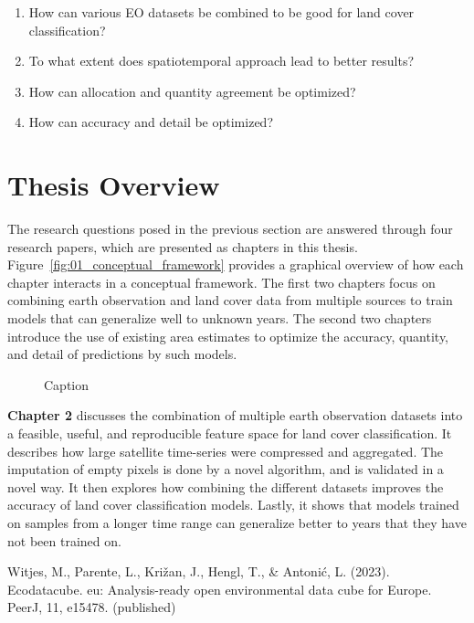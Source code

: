 \begin{enumerate}
    \item How can various EO datasets be combined to be good for land cover classification?
    \item To what extent does spatiotemporal approach lead to better results?
    \item How can allocation and quantity agreement be optimized?
    \item How can accuracy and detail be optimized?
\end{enumerate}



\section{Thesis Overview}

The research questions posed in the previous section are answered through four research papers, which are presented as chapters in this thesis. Figure~\ref{fig:01_conceptual_framework} provides a graphical overview of how each chapter interacts in a conceptual framework. The first two chapters focus on combining earth observation and land cover data from multiple sources to train models that can generalize well to unknown years. The second two chapters introduce the use of existing area estimates to optimize the accuracy, quantity, and detail of predictions by such models.

\begin{figure}
    \centering
    \caption{Caption}
    \label{fig:enter-label}
\end{figure}

\textbf{Chapter 2} discusses the combination of multiple earth observation datasets into a feasible, useful, and reproducible feature space for land cover classification. It describes how large satellite time-series were compressed and aggregated. The imputation of empty pixels is done by a novel algorithm, and is validated in a novel way. It then explores how combining the different datasets improves the accuracy of land cover classification models. Lastly, it shows that models trained on samples from a longer time range can generalize better to years that they have not been trained on.

Witjes, M., Parente, L., Križan, J., Hengl, T., \& Antonić, L. (2023). Ecodatacube. eu: Analysis-ready open environmental data cube for Europe. PeerJ, 11, e15478. (published)


